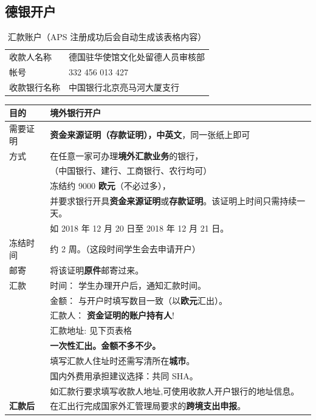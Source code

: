 \documentclass[oneside,final]{book}
\begin{document}
\begin{appendices}
\newpage

\chapter{德银开户}\label{ap:bank}
\begin{table}[htbp]
  \caption{汇款账户（APS 注册成功后会自动生成该表格内容）}
  \label{tb:bank-account}
  \centering
  \begin{tabular}{ll}
    \toprule
    收款人名称 & 德国驻华使馆文化处留德人员审核部 \\
    帐号 & 332 456 013 427 \\
    收款银行名称 & 中国银行北京亮马河大厦支行 \\
    \bottomrule
  \end{tabular}
\end{table}

\begin{center}
\begin{tabular}{ll}
  \toprule
  目的 & 境外银行\textbf{开户} \\ \midrule
  需要证明 & \textbf{资金来源证明（存款证明），\color{blue}中英文}，同一张纸上即可 \\ \midrule
  方式 & 在任意一家可办理\textbf{\color{blue}境外汇款业务}的银行，\\
  & （中国银行、建行、工商银行、农行均可） \\
  & 冻结约 9000 \textbf{\color{blue}欧元}（不必过多）， \\
  & 并要求银行开具\textbf{资金来源证明}或\textbf{存款证明}。该证明上时间只需持续一天。 \\
  & 如 2018 年 12 月 20 日至 2018 年 12 月 21 日。 \\
  冻结时间 & 约 2 周。（这段时间学生会去申请开户） \\ \midrule
  邮寄 & 将该证明\textbf{原件}邮寄过来。 \\ \midrule
  汇款 & {\color{blue}时间}： 学生办理开户后，通知汇款时间。 \\
  & {\color{blue}金额}： 与开户时填写数目一致（以\textbf{\color{blue}欧元}汇出）。 \\
  & {\color{blue}汇款人}： \textbf{资金证明的账户\color{blue}持有人}! \\
  & {\color{blue}汇款地址}: 见下页表格 \\
  & \textbf{一次性汇出。金额不多不少。} \\
  & 填写汇款人住址时还需写清所在\textbf{城市}。 \\
  & 国内外费用承担建议选择：共同 SHA。 \\
  & 如汇款行要求填写收款人地址,可使用收款人开户银行的地址信息。 \\ \midrule
  \textbf{汇款后} & 在汇出行完成国家外汇管理局要求的\textbf{跨境支出申报}。 \\  
  \bottomrule
\end{tabular}
\end{center}


\end{appendices}
\end{document}
